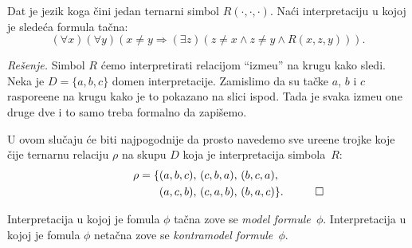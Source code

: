 \begin{EX}
  Dat je jezik koga \v cini jedan ternarni simbol $R(\cdot, \cdot, \cdot)$.
  Na\'ci interpretaciju u kojoj je slede\'ca formula ta\v cna:
  $$
    (\forall x)(\forall y)(x \ne y \Rightarrow (\exists z)(z \ne x \land z \ne y \land R(x, z, y))).
  $$
\end{EX}

\noindent
\textit{Re\v senje.}
    Simbol $R$ \'cemo interpretirati relacijom \enquote{izme\dj u} na krugu kako sledi.
    Neka je $D = \{a, b, c\}$ domen interpretacije. Zamislimo da su ta\v cke $a$, $b$ i $c$ raspore\dj ene
    na krugu kako je to pokazano na slici ispod. Tada je svaka izme\dj u one druge dve i to samo treba formalno
    da zapi\v semo.

\medskip
    
\noindent
\begin{minipage}{3in}
    \hspace*{1.5em}U ovom slu\v caju \'ce biti najpogodnije da prosto navedemo sve ure\dj ene trojke
    koje \v cije ternarnu relaciju $\rho$ na skupu $D$ koja je interpretacija simbola~$R$:
    \begin{align*}
      \rho = \{ &(a, b, c), \, (c, b, a), \, (b, c, a),\\
                &(a, c, b), \, (c, a, b), \, (b, a, c)\}. \rlap{\hspace*{1cm}$\square$}
    \end{align*}
\end{minipage}
\hfill
\begin{minipage}{2.5in}
  \begin{center}
    
  \end{center}
\end{minipage}

\begin{DEF}
  Interpretacija u kojoj je fomula $\phi$ ta\v cna zove se \emph{model formule~$\phi$}.
  Interpretacija u kojoj je fomula $\phi$ neta\v cna zove se \emph{kontramodel formule~$\phi$}.
\end{DEF}

